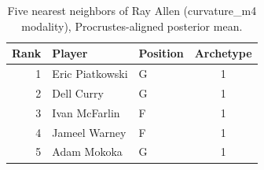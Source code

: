 \begin{table}[htbp]
  \centering\small
  \begin{tabular}{rllc}
    \toprule
    Rank & Player & Position & Archetype \\
    \midrule
    1 & Eric Piatkowski & G & 1 \\
    2 & Dell Curry & G & 1 \\
    3 & Ivan McFarlin & F & 1 \\
    4 & Jameel Warney & F & 1 \\
    5 & Adam Mokoka & G & 1 \\
    \bottomrule
  \end{tabular}
  \caption{Five nearest neighbors of Ray Allen (curvature_m4 modality), Procrustes-aligned posterior mean.}
  \label{tab:Ray_Allen_neighbors_curvature_m4}
\end{table}

